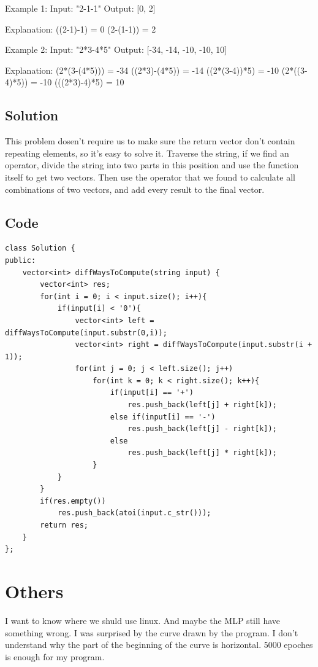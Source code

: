 \documentclass[10pt]{article}
\begin{document}
        Example 1: \qquad Input: "2-1-1" \qquad Output: [0, 2]

        Explanation: \qquad ((2-1)-1) = 0 \qquad (2-(1-1)) = 2

        Example 2: \qquad Input: "2*3-4*5" \qquad Output: [-34, -14, -10, -10, 10]

        Explanation: \qquad (2*(3-(4*5))) = -34 \qquad ((2*3)-(4*5)) = -14 \qquad ((2*(3-4))*5) = -10 \qquad (2*((3-4)*5)) = -10 \qquad (((2*3)-4)*5) = 10

        \subsection*{Solution}
        This problem dosen't require us to make sure the return vector don't contain repeating elements, so it's easy to solve it. Traverse the string, if we find an operator, divide the string into two parts in this position and use the function itself to get two vectors. Then use the operator that we found to calculate all combinations of two vectors, and add every result to the final vector.

        \newpage

        \subsection*{Code}
        \begin{lstlisting}
class Solution {
public:
    vector<int> diffWaysToCompute(string input) {
        vector<int> res;
        for(int i = 0; i < input.size(); i++){
            if(input[i] < '0'){
                vector<int> left = diffWaysToCompute(input.substr(0,i));
                vector<int> right = diffWaysToCompute(input.substr(i + 1));
                for(int j = 0; j < left.size(); j++)
                    for(int k = 0; k < right.size(); k++){
                        if(input[i] == '+')
                            res.push_back(left[j] + right[k]);
                        else if(input[i] == '-')
                            res.push_back(left[j] - right[k]);
                        else
                            res.push_back(left[j] * right[k]);
                    }
            }
        }
        if(res.empty())
            res.push_back(atoi(input.c_str()));  
        return res;
    }
};
        \end{lstlisting}


        \section*{Others}
        I want to know where we shuld use linux. And maybe the MLP still have something wrong. I was surprised by the curve drawn by the program. I don't understand why the part of the beginning of the curve is horizontal. 5000 epoches is enough for my program.
        
\end{document}
